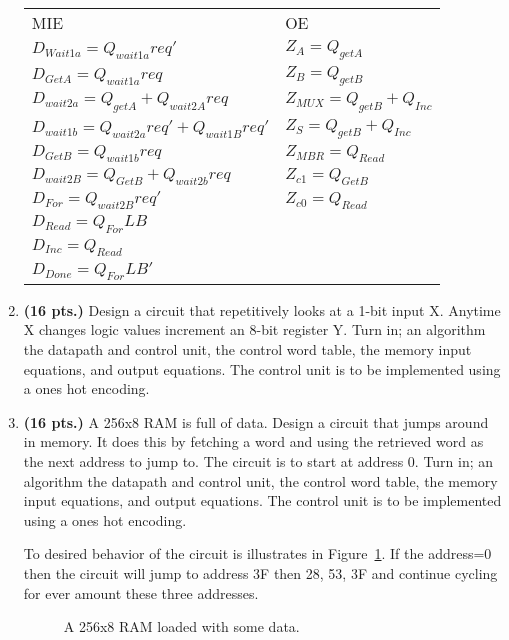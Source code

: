 \begin{enumerate}
\begin{onlysolution}
{\begin{tabular}{ll}
MIE					&	OE			\\
$D_{Wait1a}= Q_{wait1a}req'$		&  $Z_{A} = Q_{getA}$		\\
$D_{GetA } = Q_{wait1a}req$		&  $Z_{B} = Q_{getB}$		\\
$D_{wait2a}= Q_{getA} + Q_{wait2A}req$	&  $Z_{MUX} = Q_{getB} + Q_{Inc}$		\\
$D_{wait1b}= Q_{wait2a}req' + Q_{wait1B}req'$	&  $Z_{S} = Q_{getB} + Q_{Inc}$		\\
$D_{GetB } = Q_{wait1b}req$		&  $Z_{MBR} = Q_{Read}$		\\
$D_{wait2B}= Q_{GetB} + Q_{wait2b}req$	&  $Z_{c1} = Q_{GetB}$		\\
$D_{For  } = Q_{wait2B}req'$		&  $Z_{c0} = Q_{Read}$		\\
$D_{Read } = Q_{For}LB$			&  		\\
$D_{Inc  } = Q_{Read}$			& 		\\
$D_{Done } = Q_{For}LB'$		&  		\\
\end{tabular}

} \end{onlysolution} 

\item  \textbf{ (16 pts.)}
Design a circuit that repetitively looks at a 1-bit input X.
Anytime X changes logic values increment an 8-bit
register Y.  
Turn in; an algorithm the datapath and control unit, the control word 
table, the memory input equations, and output equations.  
The control unit is to be implemented using a ones hot encoding.


\item \textbf{ (16 pts.)}
A 256x8 RAM is full of data.  Design a circuit that jumps
around in memory.  It does this by fetching a word and using the
retrieved word as the next address to jump to.  The circuit is to 
start at address 0. 
Turn in; an algorithm the datapath and control unit, the control word 
table, the memory input equations, and output equations.  
The control unit is to be implemented using a ones hot encoding.


To desired behavior of the circuit is illustrates in 
Figure~\ref{fig:RAMhopper}.  If the address=0 then the circuit will
jump to address 3F then 28, 53, 3F and continue cycling
for ever amount these three addresses.

\begin{figure}[ht]
\caption{A 256x8 RAM loaded with some data.}
\label{fig:RAMhopper}
\end{figure}


\end{enumerate}

